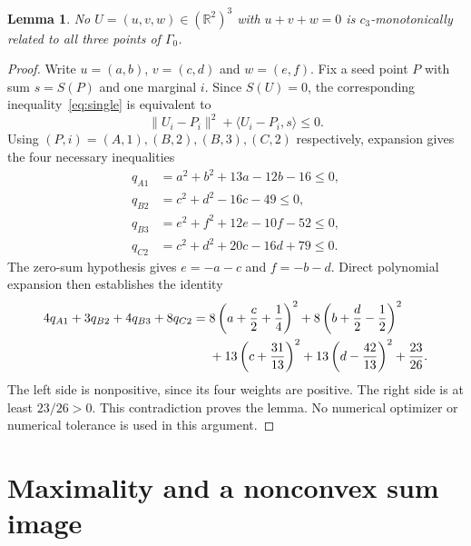 \documentclass[11pt]{article}
\newtheorem{lemma}[theorem]{Lemma}
\newcommand{\R}{\mathbb R}
\newcommand{\ip}[2]{\langle #1,#2\rangle}
\newcommand{\norm}[1]{\lVert #1\rVert}
\begin{document}
\begin{lemma}\label{lem:nozero}
No $U=(u,v,w)\in(\R^2)^3$ with $u+v+w=0$ is $c_3$-monotonically related
to all three points of $\Gamma_0$.
\end{lemma}
\begin{proof}
Write $u=(a,b)$, $v=(c,d)$ and $w=(e,f)$. Fix a seed point $P$ with sum
$s=S(P)$ and one marginal $i$. Since $S(U)=0$, the corresponding
inequality~\eqref{eq:single} is equivalent to
\begin{equation}\label{eq:qgeneral}
 \norm{U_i-P_i}^2+\ip{U_i-P_i}{s}\le0.
\end{equation}
Using $(P,i)=(A,1),(B,2),(B,3),(C,2)$ respectively, expansion gives the
four necessary inequalities
\begin{align*}
 q_{A1}&=a^2+b^2+13a-12b-16\le0,\\
 q_{B2}&=c^2+d^2-16c-49\le0,\\
 q_{B3}&=e^2+f^2+12e-10f-52\le0,\\
 q_{C2}&=c^2+d^2+20c-16d+79\le0.
\end{align*}
The zero-sum hypothesis gives $e=-a-c$ and $f=-b-d$. Direct polynomial
expansion then establishes the identity
\begin{align}\label{eq:certificate}
 4q_{A1}+3q_{B2}+4q_{B3}+8q_{C2}
 ={}&8\left(a+\frac c2+\frac14\right)^2
     +8\left(b+\frac d2-\frac12\right)^2\notag\\
   &+13\left(c+\frac{31}{13}\right)^2
     +13\left(d-\frac{42}{13}\right)^2
     +\frac{23}{26}.
\end{align}
The left side is nonpositive, since its four weights are positive.
The right side is at least $23/26>0$. This contradiction proves the lemma.
No numerical optimizer or numerical tolerance is used in this argument.
\end{proof}

\section{Maximality and a nonconvex sum image}
\end{document}
